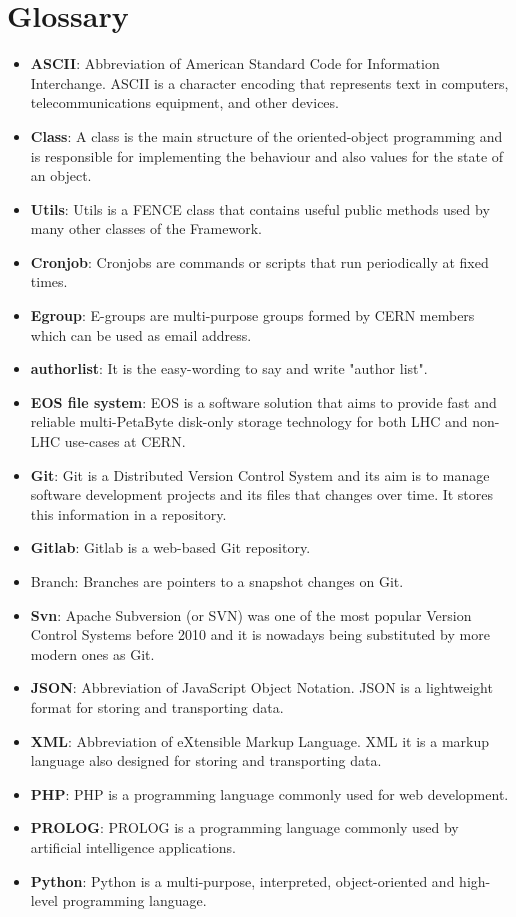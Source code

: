 \section*{Glossary}
\label{sec:Glossary}

\begin{itemize}
\item \textbf{ASCII}: Abbreviation of American Standard Code for Information Interchange. ASCII is a character encoding that represents text in computers, telecommunications equipment\textbf{}, and other devices.
\item \textbf{Class}: A class is the main structure of the oriented-object programming and is responsible for implementing the behaviour and also values for the state of an object.
\item \textbf{Utils}: Utils is a FENCE class that contains useful public methods used by many other classes of the Framework.
\item \textbf{Cronjob}: Cronjobs are commands or scripts that run periodically at fixed times.
\item \textbf{Egroup}: E-groups are multi-purpose groups formed by CERN members which can be used as email address.
\item \textbf{authorlist}: It is the easy-wording to say and write "author list". 
\item \textbf{EOS file system}: EOS is a software solution that aims to provide fast and reliable multi-PetaByte disk-only storage technology for both LHC and non-LHC use-cases at CERN.
\item \textbf{Git}: Git is a Distributed Version Control System and its aim is to manage software development projects and its files that changes over time. It stores this information in a repository.
\item \textbf{Gitlab}: Gitlab is a web-based Git repository.
\item Branch: Branches are pointers to a snapshot changes on Git.
\item \textbf{Svn}: Apache Subversion (or SVN) was one of the most popular Version Control Systems before 2010 and it is nowadays being substituted by more modern ones as Git.
\item \textbf{JSON}: Abbreviation of JavaScript Object Notation. JSON is a lightweight format for storing and transporting data.
\item \textbf{XML}: Abbreviation of eXtensible Markup Language. XML it is a markup language also designed for storing and transporting data.
\item \textbf{PHP}: PHP is a programming language commonly used for web development.
\item \textbf{PROLOG}: PROLOG is a programming language commonly used by artificial intelligence applications.
\item \textbf{Python}: Python is a multi-purpose, interpreted, object-oriented and high-level programming language.
\end{itemize}


